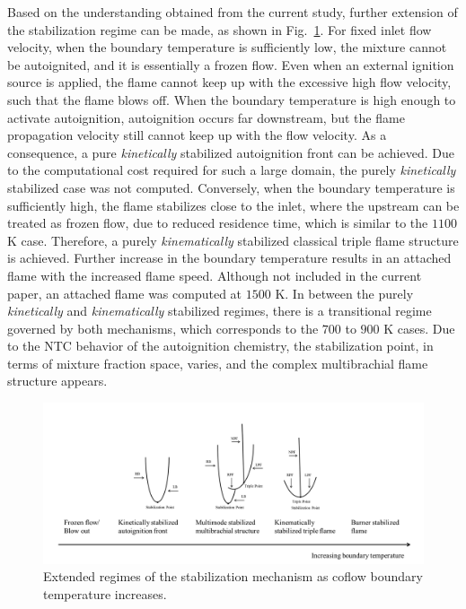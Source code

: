 \documentclass[review,3p,times]{elsarticle}
\begin{document}
Based on the understanding obtained from the current study, further extension of the stabilization regime can be made, as shown in Fig.~\ref{fig:regime}.  For fixed inlet flow velocity, when the boundary temperature is sufficiently low, the mixture cannot be autoignited, and it is essentially a frozen flow.  Even when an external ignition source is applied, the flame cannot keep up with the excessive high flow velocity, such that the flame blows off.  When the boundary temperature is high enough to activate autoignition, autoignition occurs far downstream, but the flame propagation velocity still cannot keep up with the flow velocity.  As a consequence, a pure \emph {kinetically} stabilized autoignition front can be achieved.  Due to the computational cost required for such a large domain, the purely \emph {kinetically} stabilized case was not computed.  Conversely, when the boundary temperature is sufficiently high, the flame stabilizes close to the inlet, where the upstream can be treated as frozen flow, due to reduced residence time, which is similar to the $1100$ K case.  Therefore, a purely \emph {kinematically} stabilized classical triple flame structure is achieved.  Further increase in the boundary temperature results in an attached flame with the increased flame speed.  Although not included in the current paper, an attached flame was computed at $1500$ K.  In between the purely \emph {kinetically} and \emph {kinematically} stabilized regimes, there is a transitional regime governed by both mechanisms, which corresponds to the $700$ to $900$ K cases.  Due to the NTC behavior of the autoignition chemistry, the stabilization point, in terms of mixture fraction space, varies, and the complex multibrachial flame structure appears.  

\begin{figure}[t]
  \centering
  \scriptsize
  \includegraphics[width=1.0\textwidth]{regime.png}
  \normalsize
  \caption{Extended regimes of the stabilization mechanism as coflow boundary temperature increases.}
  \label{fig:regime}
\end{figure}
\end{document}
